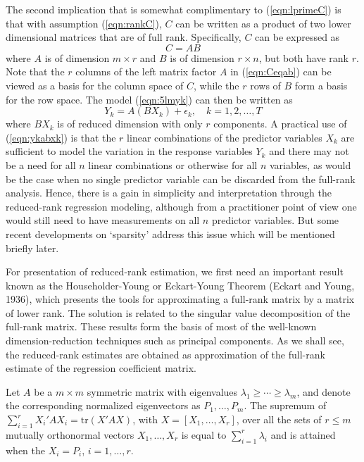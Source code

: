 The second implication that is somewhat complimentary to (\ref{eqn:lprimeC}) is that with assumption (\ref{eqn:rankC}), $C$ can be written as a product of two lower dimensional matrices that are of full rank. Specifically, $C$ can be expressed as
	\begin{equation}\label{eqn:Ceqab}
	C=AB
	\end{equation}
where $A$ is of dimension $m \times r$ and $B$ is of dimension $r \times n$, but both have rank $r$. Note that the $r$ columns of the left matrix factor $A$ in (\ref{eqn:Ceqab}) can be viewed as a basis for the column space of $C$, while the $r$ rows of $B$ form a basis for the row space. The model (\ref{eqn:5lmyk}) can then be written as
	\begin{equation}\label{eqn:ykabxk}
	Y_k=A(BX_k)+\epsilon_k, \quad k=1,2,\ldots,T
	\end{equation}
where $BX_k$ is of reduced dimension with only $r$ components. A practical use of (\ref{eqn:ykabxk}) is that the $r$ linear combinations of the predictor variables $X_k$ are sufficient to model the variation in the response variables $Y_k$ and there may not be a need for all $n$ linear combinations or otherwise for all $n$ variables, as would be the case when no single predictor variable can be discarded from the full-rank analysis. Hence, there is a gain in simplicity and interpretation through the reduced-rank regression modeling, although from a practitioner point of view one would still need to have measurements on all $n$ predictor variables. But some recent developments on `sparsity' address this issue which will be mentioned briefly later.


For presentation of reduced-rank estimation, we first need an important result known as the Householder-Young or Eckart-Young Theorem (Eckart and Young, 1936), which presents the tools for approximating a full-rank matrix by a matrix of lower rank. The solution is related to the singular value decomposition of the full-rank matrix. These results form the basis of most of the well-known dimension-reduction techniques such as principal components. As we shall see, the reduced-rank estimates are obtained as approximation of the full-rank estimate of the regression coefficient matrix. 


\setcounter{result}{0}
\begin{result}\label{res:2}
Let $A$ be a $m \times m$ symmetric matrix with eigenvalues $\lambda_1 \geq \cdots \geq \lambda_m$, and denote the corresponding normalized eigenvectors as $P_1,\ldots,P_m$. The supremum of $\sum_{i=1}^r X_i'AX_i=\text{tr}(X'AX)$, with $X=[X_1,\ldots,X_r]$, over all the sets of $r \leq m$ mutually orthonormal vectors $X_1,\ldots,X_r$ is equal to $\sum_{i=1}^r \lambda_i$ and is attained when the $X_i=P_i$, $i=1,\ldots,r$. 
\end{result}


